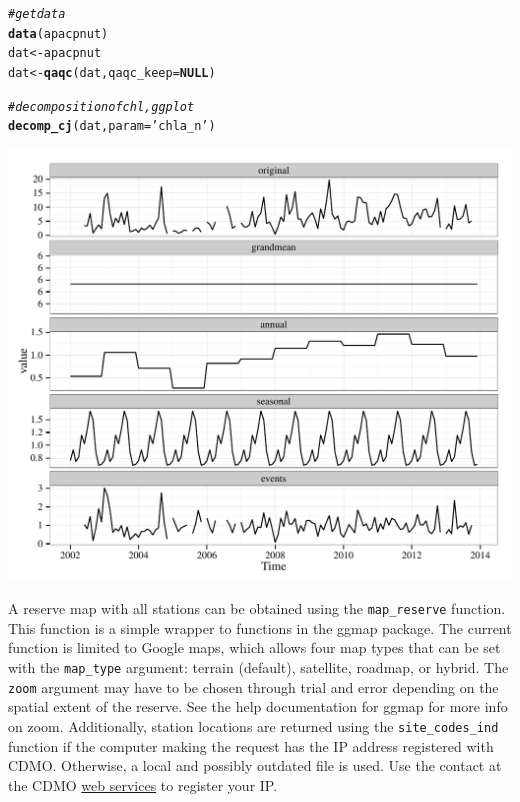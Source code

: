 \documentclass[10pt,letterpaper]{article}\usepackage[]{graphicx}\usepackage[]{color}
\makeatletter
\def\maxwidth{ %
  \ifdim\Gin@nat@width>\linewidth
    \linewidth
  \else
    \Gin@nat@width
  \fi
}
\newcommand{\hlstr}[1]{\textcolor[rgb]{0.192,0.494,0.8}{#1}}%
\newcommand{\hlcom}[1]{\textcolor[rgb]{0.678,0.584,0.686}{\textit{#1}}}%
\newcommand{\hlstd}[1]{\textcolor[rgb]{0.345,0.345,0.345}{#1}}%
\newcommand{\hlkwa}[1]{\textcolor[rgb]{0.161,0.373,0.58}{\textbf{#1}}}%
\newcommand{\hlkwb}[1]{\textcolor[rgb]{0.69,0.353,0.396}{#1}}%
\newcommand{\hlkwc}[1]{\textcolor[rgb]{0.333,0.667,0.333}{#1}}%
\newcommand{\hlkwd}[1]{\textcolor[rgb]{0.737,0.353,0.396}{\textbf{#1}}}%
\newenvironment{kframe}{%
 \def\at@end@of@kframe{}%
 \ifinner\ifhmode%
  \def\at@end@of@kframe{\end{minipage}}%
  \begin{minipage}{\columnwidth}%
 \fi\fi%
 \def\FrameCommand##1{\hskip\@totalleftmargin \hskip-\fboxsep
 \colorbox{shadecolor}{##1}\hskip-\fboxsep
     \hskip-\linewidth \hskip-\@totalleftmargin \hskip\columnwidth}%
 \MakeFramed {\advance\hsize-\width
   \@totalleftmargin\z@ \linewidth\hsize
   \@setminipage}}%
 {\par\unskip\endMakeFramed%
 \at@end@of@kframe}
\newenvironment{knitrout}{}{} %
\makeatother
\begin{document}
\begin{knitrout}
\color{fgcolor}\begin{kframe}
\begin{alltt}
\hlcom{# get data}
\hlkwd{data}\hlstd{(apacpnut)}
\hlstd{dat} \hlkwb{<-} \hlstd{apacpnut}
\hlstd{dat} \hlkwb{<-} \hlkwd{qaqc}\hlstd{(dat,} \hlkwc{qaqc_keep} \hlstd{=} \hlkwa{NULL}\hlstd{)}

\hlcom{# decomposition of chl, ggplot}
\hlkwd{decomp_cj}\hlstd{(dat,} \hlkwc{param} \hlstd{=} \hlstr{'chla_n'}\hlstd{)}
\end{alltt}
\end{kframe}

{\centering \includegraphics[width=\maxwidth]{figure/unnamed-chunk-19} 

}



\end{knitrout}

A reserve map with all stations can be obtained using the \texttt{map\_reserve} function.  This function is a simple wrapper to functions in the ggmap package. The current function is limited to Google maps, which allows four map types that can be set with the \texttt{map\_type} argument: terrain (default), satellite, roadmap, or hybrid.  The \texttt{zoom} argument may have to be chosen through trial and error depending on the spatial extent of the reserve.  See the help documentation for ggmap for more info on zoom.  Additionally, station locations are returned using the \texttt{site\_codes\_ind} function if the computer making the request has the IP address registered with CDMO. Otherwise, a local and possibly outdated file is used.  Use the contact at the CDMO \href{http://cdmo.baruch.sc.edu/webservices.cfm}{web services} to register your IP.
\end{document}
